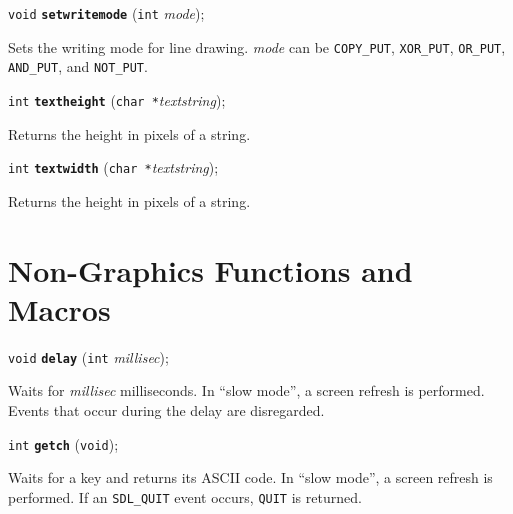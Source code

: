 \documentclass[a4paper,12pt]{article}
\newcommand{\V}{\texttt{void}}      %
\newcommand{\I}{\texttt{int}}       %
\newcommand{\C}{\texttt{char *}}    %
\newcommand{\func}[1]{\textbf{\texttt{#1}}}  %
\newcommand{\A}[1]{\emph{#1}}       %
\newcommand{\T}[1]{\texttt{#1}}     %
\newenvironment{bgi}
{ %
  \begin{snugshade}
}
{ %
  \end{snugshade}
}
\begin{document}

\label{sec:setwritemode}

\begin{bgi}
\V{} \func{setwritemode} (\I{} \A{mode});
\end{bgi}

Sets the writing mode for line drawing. \A{mode} can be \T{COPY\_PUT},
\T{XOR\-\_PUT}, \T{OR\_PUT}, \T{AND\_PUT}, and \T{NOT\_PUT}.


\label{sec:textheight}

\begin{bgi}
\I{} \func{textheight} (\C{}\A{textstring});
\end{bgi}

Returns the height in pixels of a string.


\label{sec:textwidth}

\begin{bgi}
\I{} \func{textwidth} (\C{}\A{textstring});
\end{bgi}

Returns the height in pixels of a string.


\section{Non-Graphics Functions and Macros}

\begin{bgi}
\V{} \func{delay} (\I{} \A{millisec});
\end{bgi}

Waits for \A{millisec} milliseconds. In ``slow mode'', a screen
refresh is performed. Events that occur during the delay are
disregarded.


\label{sec:getch}

\begin{bgi}
\I{} \func{getch} (\V{});
\end{bgi}

Waits for a key and returns its ASCII code. In ``slow mode'', a screen
refresh is performed. If an \T{SDL\_QUIT} event occurs, \T{QUIT} is
returned.
\end{document}
